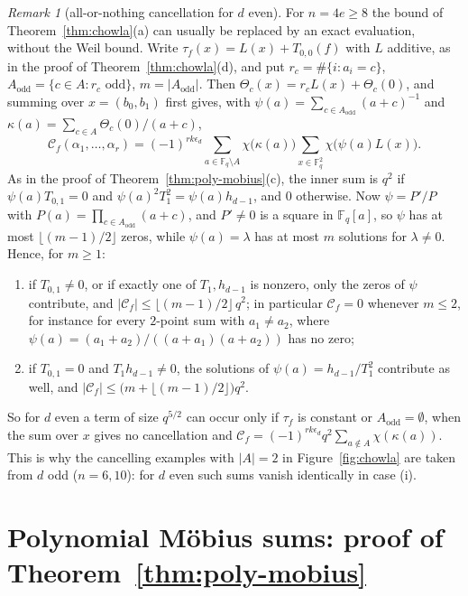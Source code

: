 \documentclass[11pt,a4paper]{amsart}
\theoremstyle{remark}
\newtheorem{remark}[theorem]{Remark}
\numberwithin{equation}{section}
\newcommand{\Fq}{\mathbb{F}_q}
\begin{document}
\begin{remark}[all-or-nothing cancellation for $d$ even]\label{rem:allornothing}
For $n=4e\ge8$ the bound of Theorem~\ref{thm:chowla}(a) can usually be replaced by an exact evaluation, without
the Weil bound. Write $\tau_f(x)=L(x)+T_{0,0}(f)$ with $L$ additive, as in the proof of
Theorem~\ref{thm:chowla}(d), and put $r_c=\#\{i:a_i=c\}$, $A_{\mathrm{odd}}=\{c\in A:r_c\text{ odd}\}$,
$m=|A_{\mathrm{odd}}|$. Then $\Theta_c(x)=r_cL(x)+\Theta_c(0)$, and summing over $x=(b_0,b_1)$ first gives, with
$\psi(a)=\sum_{c\in A_{\mathrm{odd}}}(a+c)^{-1}$ and $\kappa(a)=\sum_{c\in A}\Theta_c(0)/(a+c)$,
\[
\mathcal C_f(\alpha_1,\dots,\alpha_r)=(-1)^{rk\epsilon_d}\sum_{a\in\Fq\setminus A}\chi\bigl(\kappa(a)\bigr)
\sum_{x\in\Fq^2}\chi\bigl(\psi(a)L(x)\bigr).
\]
As in the proof of Theorem~\ref{thm:poly-mobius}(c), the inner sum is $q^2$ if $\psi(a)T_{0,1}=0$ and
$\psi(a)^2T_1^2=\psi(a)h_{d-1}$, and $0$ otherwise. Now $\psi=P'/P$ with $P(a)=\prod_{c\in A_{\mathrm{odd}}}(a+c)$,
and $P'\ne0$ is a square in $\Fq[a]$, so $\psi$ has at most $\lfloor(m-1)/2\rfloor$ zeros, while $\psi(a)=\lambda$
has at most $m$ solutions for $\lambda\ne0$. Hence, for $m\ge1$:
\begin{enumerate}
\item[(i)] if $T_{0,1}\ne0$, or if exactly one of $T_1,h_{d-1}$ is nonzero, only the zeros of $\psi$ contribute, and
$|\mathcal C_f|\le\lfloor(m-1)/2\rfloor\,q^2$; in particular $\mathcal C_f=0$ whenever $m\le2$, for instance for
every $2$-point sum with $a_1\ne a_2$, where $\psi(a)=(a_1+a_2)/((a+a_1)(a+a_2))$ has no zero;
\item[(ii)] if $T_{0,1}=0$ and $T_1h_{d-1}\ne0$, the solutions of $\psi(a)=h_{d-1}/T_1^2$ contribute as well, and
$|\mathcal C_f|\le\bigl(m+\lfloor(m-1)/2\rfloor\bigr)q^2$.
\end{enumerate}
So for $d$ even a term of size $q^{5/2}$ can occur only if $\tau_f$ is constant or $A_{\mathrm{odd}}=\emptyset$,
when the sum over $x$ gives no cancellation and $\mathcal C_f=(-1)^{rk\epsilon_d}q^2\sum_{a\notin A}\chi(\kappa(a))$.
This is why the cancelling examples with $|A|=2$ in Figure~\ref{fig:chowla} are taken from $d$ odd ($n=6,10$): for
$d$ even such sums vanish identically in case (i).
\end{remark}

\section{Polynomial M\"obius sums: proof of
\texorpdfstring{Theorem~\ref{thm:poly-mobius}}{Theorem 1.4}}\label{sec:poly}
\end{document}
